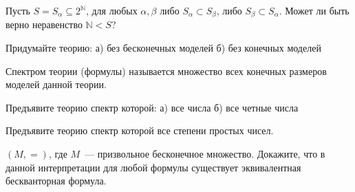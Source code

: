 \setcounter{curtask}{14}



\begin{task}
    Пусть $S = {S_{\alpha} \subseteq 2^{\mathbb{N}}}$, для любых $\alpha, \beta$ либо
    $S_{\alpha} \subset S_{\beta}$, либо $S_{\beta} \subset S_{\alpha}$. Может ли
    быть верно неравенство $\mathbb{N} < S$?
\end{task}

\begin{task}
    Придумайте теорию:
    а) без бесконечных моделей
    б) без конечных моделей
\end{task}

Спектром теории (формулы) называется множество всех конечных размеров моделей данной
теории.

\begin{task}
    Предъявите теорию спектр которой:
    а) все числа
    б) все четные числа
\end{task}

\begin{task}
    Предъявите теорию спектр которой все степени простых чисел.
\end{task}

\begin{task}
    $(M, =)$, где $M$~--- призвольное бесконечное множество. Докажите, что в данной
    интерпретации для любой формулы существует эквивалентная бескванторная формула.
\end{task}